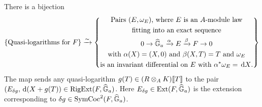 \documentclass[../main.tex]{subfiles}
\begin{document}
\begin{thm}
  \label{thm:RigExtStr}
  There is a bijection
  \begin{equation}\label{eq:QLogBijection}
    \{\text{Quasi-logarithms for $F$}\} \xrightarrow{\sim} 
      \left\{
      \begin{gathered}
        \text{Pairs $(E, \omega_E)$, where $E$ is an $A$-module law} \\
        \text{fitting into  an exact sequence}
        \\ 0 \to \widehat{\mathbb{G}}_a \xrightarrow{\alpha} E \xrightarrow{\beta} F \to 0 \\
        \text{with $\alpha(X) = (X, 0)$ and $\beta(X, T) = T$ and $\omega_E$} \\
        \text{is an invariant differential on $E$ with 
        $\alpha^* \omega_E = \, \mathrm{d} X$.} \\
      \end{gathered}
      \right\}
  \end{equation}
The map sends any quasi-logarithm $g(T) \in (R\otimes_A K)\llbracket T \rrbracket$
to the pair $(E_{\delta g}, \, \mathrm{d} (X + g(T)) \in \operatorname {RigExt}(F, \widehat{\mathbb{G}}_a)$. Here
$E_{\delta g} \in \operatorname{Ext}(F, \widehat{\mathbb{G}}_a)$ is the extension corresponding to 
$\delta g \in \operatorname{SymCoc}^2(F,\widehat{\mathbb{G}}_a)$. 


\end{thm}
\end{document}

